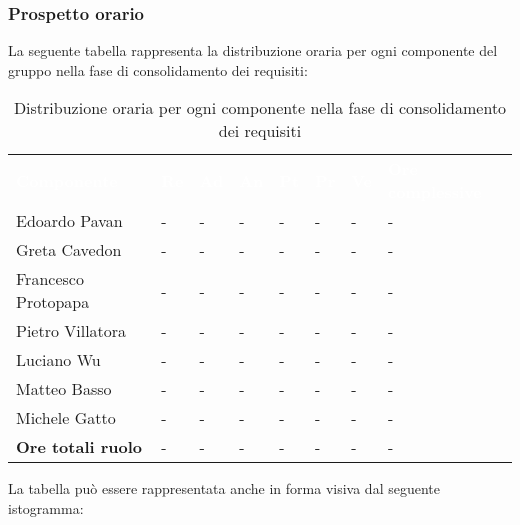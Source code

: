 \subsubsection{Prospetto orario}
La seguente tabella rappresenta la distribuzione oraria per ogni componente del gruppo nella fase di consolidamento dei requisiti:
\begin{table}[!htbp]
\begin{center}
\renewcommand{\arraystretch}{1.25}
\begin{tabular}{ m{}<{\centering}  m{}<{\centering} m{}<{\centering} m{}<{\centering}  m{}<{\centering}  m{}<{\centering}  m{}<{\centering}  m{}<{\centering}   }
	\rowcolor{darkblue}
	\textcolor{white}{\textbf{Componente}} &\textcolor{white}{\textbf{Re}}&\textcolor{white}{\textbf{Ad}}&\textcolor{white}{\textbf{An}}&\textcolor{white}{\textbf{Pt}}&\textcolor{white}{\textbf{Pr}}&\textcolor{white}{\textbf{Ve}}&\textcolor{white}{\textbf{Ore complessive}}\\ 

	Edoardo Pavan & - & - & - & - & - & - & -\\	

	\rowcolor{gray!10} Greta Cavedon & - & - & - & - & - & - & -\\
	
	Francesco Protopapa & - & - & - & - & - & - & -\\
	
	\rowcolor{gray!10} Pietro Villatora & - & - & - & - & - & - & -\\
	
	Luciano Wu & - & - & - & - & - & - & -\\
	
	\rowcolor{gray!10} Matteo Basso & - & - & - & - & - & - & -\\
	
	Michele Gatto & - & - & - & - & - & - & -\\
	
	\rowcolor{gray!10} \textbf{Ore totali ruolo} & - & - & - & - & - & - & -\\

\end{tabular}
\caption{Distribuzione oraria per ogni componente nella fase di consolidamento dei requisiti}
\end{center}
\end{table}

La tabella può essere rappresentata anche in forma visiva dal seguente istogramma:

